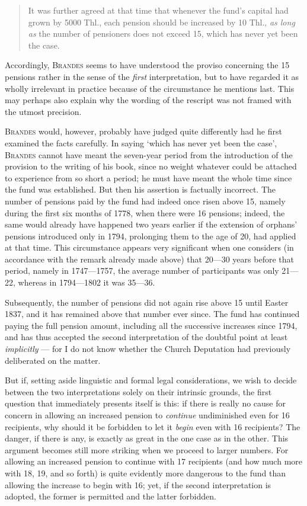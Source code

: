 \begin{quote}
It was further agreed at that time that whenever the fund's capital had grown by 5000 Thl., each pension should be increased by 10 Thl., \textit{as long as} the number of pensioners does not exceed 15, which has never yet been the case.
\end{quote}
\noindent\hspace*{\parindent}Accordingly, \textsc{Brandes} seems to have understood the proviso concerning the 15 pensions rather in the sense of the \textit{first} interpretation, but to have regarded it as wholly irrelevant in practice because of the circumstance he mentions last. This may perhaps also explain why the wording of the rescript was not framed with the utmost precision.

\textsc{Brandes} would, however, probably have judged quite differently had he first examined the facts carefully. In saying `which has never yet been the case', \textsc{Brandes} cannot have meant the seven-year period from the introduction of the provision to the writing of his book, since no weight whatever could be attached to experience from so short a period; he must have meant the whole time since the fund was established. But then his assertion is factually incorrect. The number of pensions paid by the fund had indeed once risen above 15, namely during the first six months of 1778, when there were 16 pensions; indeed, the same would already have happened
two years earlier if the extension of orphans' pensions introduced only in 1794, prolonging them to the age of 20, had applied at that time. This circumstance appears very significant when one considers (in accordance with the remark already made above) that 20—30 years before that period, namely in 1747—1757, the average number of participants was only 21—22, whereas in 1794—1802 it was 35—36.

Subsequently, the number of pensions did not again rise above 15 until Easter 1837, and it has remained above that number ever since. The fund has continued paying the full pension amount, including all the successive increases since 1794, and has thus accepted the second interpretation of the doubtful point at least \textit{implicitly} — for I do not know whether the Church Deputation had previously deliberated on the matter.

But if, setting aside linguistic and formal legal considerations, we wish to decide between the two interpretations solely on their intrinsic grounds, the first question that immediately presents itself is this: if there is really no cause for concern in allowing an increased pension to \textit{continue} undiminished even for 16 recipients, why should it be forbidden to let it \textit{begin} even with 16 recipients? The danger, if there is any, is exactly as great in the one case as in the other. This argument becomes still more striking when we proceed to larger numbers. For allowing an increased pension to continue with 17 recipients (and how much more with 18, 19, and so forth) is quite evidently more dangerous to the fund than allowing the increase to begin with 16; yet, if the second interpretation is adopted, the former is permitted and the latter forbidden.

